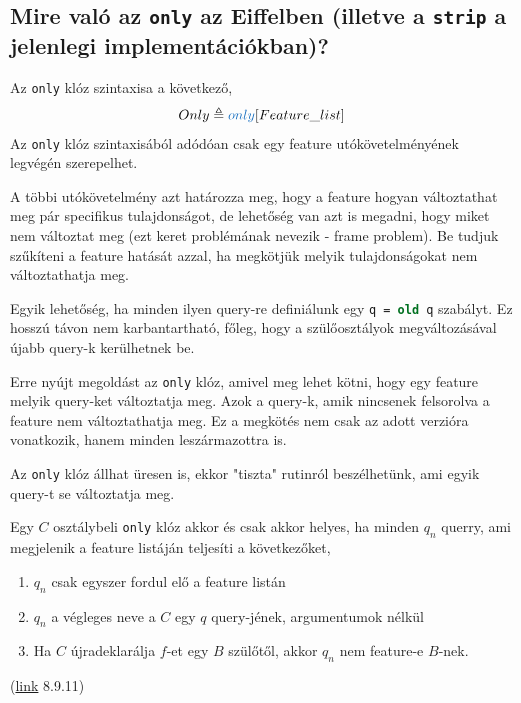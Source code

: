 \subsection{ Mire való az \lstinline[language=Eiffel]|only| az Eiffelben (illetve a \lstinline[language=Eiffel]|strip| a jelenlegi implementációkban)? }
	Az \lstinline[language=Eiffel]|only| klóz szintaxisa a következő,
	\begin{align*}
	Only \triangleq \textcolor{RoyalBlue}{only} [Feature\_list]
	\end{align*}
	Az \lstinline[language=Eiffel]|only| klóz szintaxisából adódóan csak egy feature utókövetelményének legvégén szerepelhet.
	
	A többi utókövetelmény azt határozza meg, hogy a feature hogyan változtathat meg pár specifikus tulajdonságot, de lehetőség van azt is megadni, hogy miket nem változtat meg (ezt keret problémának nevezik - frame problem). Be tudjuk szűkíteni a feature hatását azzal, ha megkötjük melyik tulajdonságokat nem változtathatja meg.
	
	Egyik lehetőség, ha minden ilyen query-re definiálunk egy \lstinline[language=Eiffel]|q = old q| szabályt. Ez hosszú távon nem karbantartható, főleg, hogy a szülőosztályok megváltozásával újabb query-k kerülhetnek be.
	
	Erre nyújt megoldást az \lstinline[language=Eiffel]|only| klóz, amivel meg lehet kötni, hogy egy feature melyik query-ket változtatja meg. Azok a query-k, amik nincsenek felsorolva a feature nem változtathatja meg. Ez a megkötés nem csak az adott verzióra vonatkozik, hanem minden leszármazottra is.
	
	Az \lstinline[language=Eiffel]|only| klóz állhat üresen is, ekkor "tiszta" rutinról beszélhetünk, ami egyik query-t se változtatja meg.
	
	Egy $C$ osztálybeli \lstinline[language=Eiffel]|only| klóz akkor és csak akkor helyes, ha minden $q_n$ querry, ami megjelenik a feature listáján teljesíti a következőket,
	\begin{enumerate}
		\item $q_n$ csak egyszer fordul elő a feature listán
		\item $q_n$ a végleges neve a $C$ egy $q$ query-jének, argumentumok nélkül
		\item Ha $C$ újradeklarálja $f$-et egy $B$ szülőtől, akkor $q_n$ nem feature-e $B$-nek. 
	\end{enumerate}
	(\href{http://www.ecma-international.org/publications/files/ECMA-ST/ECMA-367.pdf}{link} 8.9.11)
	

